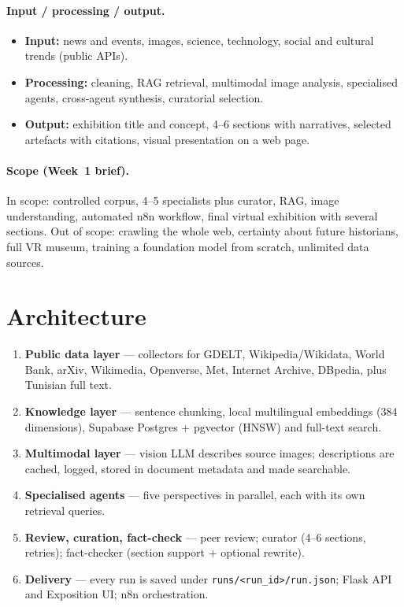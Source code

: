 \documentclass[11pt,a4paper]{article}
\begin{document}
\paragraph{Input / processing / output.}
\begin{itemize}
  \item \textbf{Input:} news and events, images, science, technology, social and cultural trends (public APIs).
  \item \textbf{Processing:} cleaning, RAG retrieval, multimodal image analysis, specialised agents, cross-agent synthesis, curatorial selection.
  \item \textbf{Output:} exhibition title and concept, 4--6 sections with narratives, selected artefacts with citations, visual presentation on a web page.
\end{itemize}

\paragraph{Scope (Week~1 brief).}
In scope: controlled corpus, 4--5 specialists plus curator, RAG, image understanding, automated n8n workflow, final virtual exhibition with several sections. Out of scope: crawling the whole web, certainty about future historians, full VR museum, training a foundation model from scratch, unlimited data sources.

\section{Architecture}

\begin{enumerate}[leftmargin=1.6em]
  \item \textbf{Public data layer} --- collectors for GDELT, Wikipedia/Wikidata, World Bank, arXiv, Wikimedia, Openverse, Met, Internet Archive, DBpedia, plus Tunisian full text.
  \item \textbf{Knowledge layer} --- sentence chunking, local multilingual embeddings (384 dimensions), Supabase Postgres + pgvector (HNSW) and full-text search.
  \item \textbf{Multimodal layer} --- vision LLM describes source images; descriptions are cached, logged, stored in document metadata and made searchable.
  \item \textbf{Specialised agents} --- five perspectives in parallel, each with its own retrieval queries.
  \item \textbf{Review, curation, fact-check} --- peer review; curator (4--6 sections, retries); fact-checker (section support + optional rewrite).
  \item \textbf{Delivery} --- every run is saved under \texttt{runs/<run\_id>/run.json}; Flask API and Exposition UI; n8n orchestration.
\end{enumerate}
\end{document}
